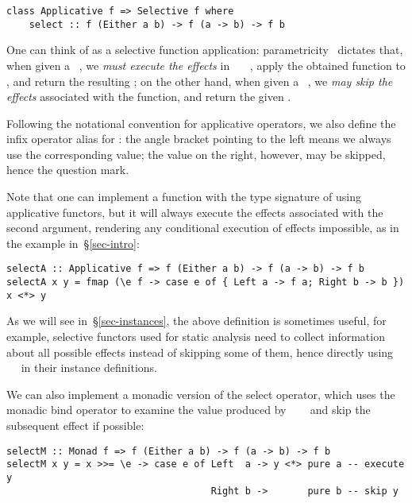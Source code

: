 \vspace{1mm}
\begin{verbatim}
class Applicative f => Selective f where
    select :: f (Either a b) -> f (a -> b) -> f b
\end{verbatim}
\vspace{1mm}

\noindent
One can think of  as a selective function application:
parametricity~\citep{wadler1989theorems} dictates that, when given a
~, we \emph{must execute the effects} in
~\hs{(}~\hs{->}~, apply the obtained function to , and
return the resulting ; on the other hand, when given a ~,
we \emph{may skip the effects} associated with the function, and return the
given .

Following the notational convention for applicative operators, we also define the infix
operator alias  for : the angle bracket pointing to the left
means we always use the corresponding value; the value on the right, however,
may be skipped, hence the question mark.

Note that one can implement a function with the type signature of 
using applicative functors, but it will always execute the effects associated
with the second argument, rendering any conditional execution of effects
impossible, as in the  example in~\S\ref{sec-intro}:

\vspace{1mm}
\begin{verbatim}
selectA :: Applicative f => f (Either a b) -> f (a -> b) -> f b
selectA x y = fmap (\e f -> case e of { Left a -> f a; Right b -> b }) x <*> y
\end{verbatim}
\vspace{1mm}

\noindent
As we will see in~\S\ref{sec-instances}, the above definition is sometimes
useful, for example, selective functors used for static analysis need to collect
information about all possible effects instead of skipping some of them,
hence directly using ~\hs{=}~ in their 
instance definitions.

We can also implement a monadic version of the select operator, which uses the
monadic bind operator to examine the value produced by
~~~ and skip the subsequent effect if possible:

\vspace{1mm}
\begin{verbatim}
selectM :: Monad f => f (Either a b) -> f (a -> b) -> f b
selectM x y = x >>= \e -> case e of Left  a -> y <*> pure a -- execute y
                                    Right b ->       pure b -- skip y
\end{verbatim}
\vspace{1mm}

